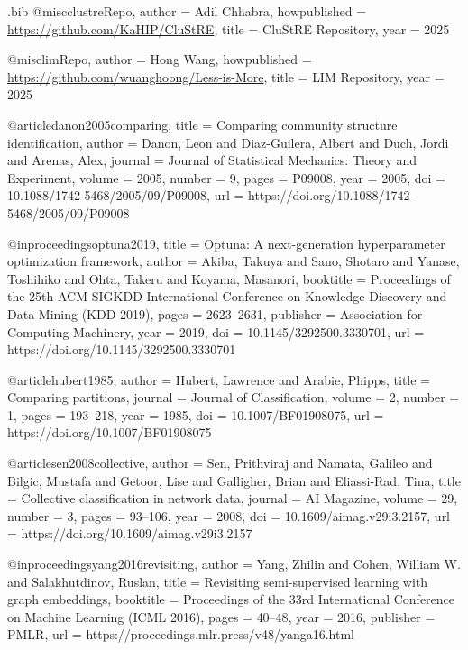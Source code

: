 \documentclass[11pt,a4paper]{article}
\begin{document}
\begin{filecontents*}[overwrite]{\jobname.bib}
@misc{clustreRepo,
  author       = {Adil Chhabra},
  howpublished = {\url{https://github.com/KaHIP/CluStRE}},
  title        = {{CluStRE} Repository},
  year         = {2025}
}

@misc{limRepo,
  author       = {Hong Wang},
  howpublished = {\url{https://github.com/wuanghoong/Less-is-More}},
  title        = {{LIM} Repository},
  year         = {2025}
}

@article{danon2005comparing,
  title   = {Comparing community structure identification},
  author  = {Danon, Leon and Diaz-Guilera, Albert and Duch, Jordi and Arenas, Alex},
  journal = {Journal of Statistical Mechanics: Theory and Experiment},
  volume  = {2005},
  number  = {9},
  pages   = {P09008},
  year    = {2005},
  doi     = {10.1088/1742-5468/2005/09/P09008},
  url     = {https://doi.org/10.1088/1742-5468/2005/09/P09008}
}

@inproceedings{optuna2019,
  title     = {Optuna: A next-generation hyperparameter optimization framework},
  author    = {Akiba, Takuya and Sano, Shotaro and Yanase, Toshihiko and Ohta, Takeru and Koyama, Masanori},
  booktitle = {Proceedings of the 25th ACM SIGKDD International Conference on Knowledge Discovery and Data Mining (KDD 2019)},
  pages     = {2623--2631},
  publisher = {Association for Computing Machinery},
  year      = {2019},
  doi       = {10.1145/3292500.3330701},
  url       = {https://doi.org/10.1145/3292500.3330701}
}

@article{hubert1985,
  author  = {Hubert, Lawrence and Arabie, Phipps},
  title   = {Comparing partitions},
  journal = {Journal of Classification},
  volume  = {2},
  number  = {1},
  pages   = {193--218},
  year    = {1985},
  doi     = {10.1007/BF01908075},
  url     = {https://doi.org/10.1007/BF01908075}
}

@article{sen2008collective,
  author  = {Sen, Prithviraj and Namata, Galileo and Bilgic, Mustafa and Getoor, Lise and Galligher, Brian and Eliassi-Rad, Tina},
  title   = {Collective classification in network data},
  journal = {AI Magazine},
  volume  = {29},
  number  = {3},
  pages   = {93--106},
  year    = {2008},
  doi     = {10.1609/aimag.v29i3.2157},
  url     = {https://doi.org/10.1609/aimag.v29i3.2157}
}

@inproceedings{yang2016revisiting,
  author    = {Yang, Zhilin and Cohen, William W. and Salakhutdinov, Ruslan},
  title     = {Revisiting semi-supervised learning with graph embeddings},
  booktitle = {Proceedings of the 33rd International Conference on Machine Learning (ICML 2016)},
  pages     = {40--48},
  year      = {2016},
  publisher = {PMLR},
  url       = {https://proceedings.mlr.press/v48/yanga16.html}
}


\end{filecontents*}
\end{document}
